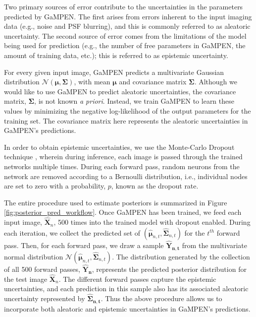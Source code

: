 \documentclass[linenumbers,twocolumn,twocolappendix]{aastex631}
\newcommand\gampen{GaMPEN}
\begin{document}
\begin{CJK*}{UTF8}{gbsn}
Two primary sources of error contribute to the uncertainties in the parameters predicted by \gampen{}. The first arises from errors inherent to the input imaging data (e.g., noise and PSF blurring), and this is commonly referred to as aleatoric uncertainty. The second source of error comes from the limitations of the model being used for prediction (e.g., the number of free parameters in \gampen{}, the amount of training data, etc.); this is referred to as epistemic uncertainty. 

For every given input image, \gampen{} predicts a multivariate Gaussian distribution $\mathcal{N}(\boldsymbol{\mu}, \boldsymbol{\Sigma})$, with mean $\boldsymbol{\mu}$ and covariance matrix $\boldsymbol{\Sigma}$. Although we would like to use \gampen{} to predict aleatoric uncertainties, the covariance matrix, $\boldsymbol{\Sigma}$, is not known {\it a priori}. Instead, we train \gampen{} to learn these values by minimizing the negative log-likelihood of the output parameters for the training set. The covariance matrix here represents the aleatoric uncertainties in \gampen{}'s predictions.

In order to obtain epistemic uncertainties, we use the Monte-Carlo Dropout technique \citep{Srivastava2014Dropout:Overfitting}, wherein during inference, each image is passed through the trained networks multiple times. During each forward pass, random neurons from the network are removed according to a Bernoulli distribution, i.e., individual nodes are set to zero with a probability, $p$, known as the dropout rate.

The entire procedure used to estimate posteriors is summarized in Figure \ref{fig:posterior_pred_workflow}. Once \gampen{} has been trained, we feed each input image, $\boldsymbol{\hat{X}}_n$, 500 times into the trained model with dropout enabled. During each iteration, we collect the predicted set of $\left(\hat{\boldsymbol{\mu}}_{n,t},\boldsymbol{\hat{\Sigma}}_{n,t}\right)$ for the $t^{th}$ forward pass. Then, for each forward pass, we draw a sample $\boldsymbol{\hat{Y}_{n,t}}$ from the multivariate normal distribution $\mathcal{N}\left(\boldsymbol{\hat{\mu}}_{n,t},\boldsymbol{\hat{\Sigma}}_{n,t}\right)$. The distribution generated by the collection of all 500 forward passes, $\boldsymbol{\hat{Y}_{n}}$,
represents the predicted posterior distribution for the test image $\boldsymbol{\hat{X}}_n$. The different forward passes capture the epistemic uncertainties, and each prediction in this sample also has its associated aleatoric uncertainty represented by $\boldsymbol{\hat{\Sigma}_{n,t}}$. Thus the above procedure allows us to incorporate both aleatoric and epistemic uncertainties in \gampen{}'s predictions.



\end{CJK*}
\end{document}
